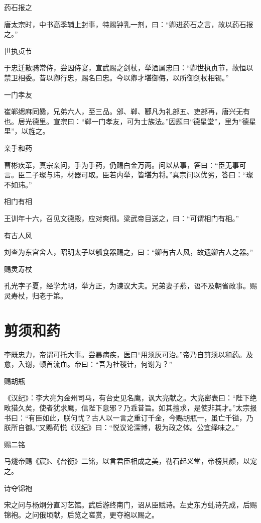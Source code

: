 \documentclass[a4paper,12pt,UTF8,twoside]{ctexbook}
\begin{document}
    药石报之
    
    唐太宗时，中书高季辅上封事，特赐钟乳一剂，曰：“卿进药石之言，故以药石报之。”
    
    世执贞节
    
    于忠迁散骑常侍，尝因侍宴，宣武赐之剑杖，举酒属忠曰：“卿世执贞节，故恒以禁卫相委。昔以卿行忠，赐名曰忠。今以卿才堪御侮，以所御剑杖相锡。”
    
    一门孝友
    
    崔郸缌麻同爨，兄弟六人，至三品。邠、郸、郾凡为礼部五、吏部再，唐兴无有也。居光德里。宣宗曰：“郸一门孝友，可为士族法。”因题曰“德星堂”，里为“德星里”，以旌之。
    
    亲手和药
    
    曹彬疾革，真宗亲问，手为手药，仍赐白金万两。问以从事，答曰：“臣无事可言。臣二子璨与玮，材器可取。臣若内举，皆堪为将。”真宗问以优劣，答曰：“璨不如玮。”
    
    相门有相
    
    王训年十六，召见文德殿，应对爽彻。梁武帝目送之，曰：“可谓相门有相。”
    
    有古人风
    
    刘查为东宫舍人，昭明太子以瓠食器赐之，曰：“卿有古人风，故遗卿古人之器。”
    
    赐灵寿杖
    
    孔光字子夏，经学尤明，举方正，为谏议大夫。兄弟妻子燕，语不及朝省政事。赐灵寿杖，归老于第。
    
    \section{剪须和药}
    
    李既忠力，帝谓可托大事。尝暴病疾，医曰“用须灰可治。”帝乃自剪须以和药。及愈，入谢，顿首流血。帝曰：“吾为社稷计，何谢为？”
    
    赐胡瓶
    
    《汉纪》：李大亮为金州司马，有台史见名鹰，讽大亮献之。大亮密表曰：“陛下绝畋猎久矣，使者犹求鹰，信陛下意邪？乃乖昔旨。如其擅求，是使非其才。”太宗报书曰：“有臣如此，朕何忧？古人以一言之重订千金，今赐胡瓶一，虽亡千镒，乃朕所自御。”又赐荀悦《汉纪》曰：“悦议论深博，极为政之体。公宜绎味之。”
    
    赐二铭
    
    马燧帝赐《宸》、《台衡》二铭，以言君臣相成之美，勒石起义堂，帝榜其颜，以宠之。
    
    诗夺锦袍
    
    宋之问与杨炯分直习艺馆。武后游终南门，诏从臣赋诗。左史东方虬诗先成，后赐锦袍。之问俄顷献，后览之嗟赏，更夺袍以赐之。
    
\end{document}
